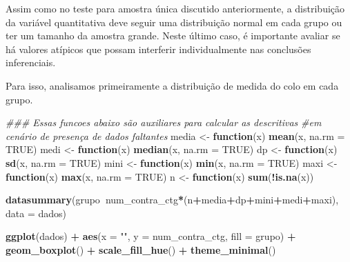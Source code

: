 \documentclass[
]{book}
\newenvironment{Shaded}{\begin{snugshade}}{\end{snugshade}}
\newcommand{\CommentTok}[1]{\textcolor[rgb]{0.56,0.35,0.01}{\textit{#1}}}
\newcommand{\ControlFlowTok}[1]{\textcolor[rgb]{0.13,0.29,0.53}{\textbf{#1}}}
\newcommand{\DataTypeTok}[1]{\textcolor[rgb]{0.13,0.29,0.53}{#1}}
\newcommand{\KeywordTok}[1]{\textcolor[rgb]{0.13,0.29,0.53}{\textbf{#1}}}
\newcommand{\NormalTok}[1]{#1}
\newcommand{\OperatorTok}[1]{\textcolor[rgb]{0.81,0.36,0.00}{\textbf{#1}}}
\newcommand{\OtherTok}[1]{\textcolor[rgb]{0.56,0.35,0.01}{#1}}
\newcommand{\StringTok}[1]{\textcolor[rgb]{0.31,0.60,0.02}{#1}}
\begin{document}
Assim como no teste para amostra única discutido anteriormente, a distribuição da variável quantitativa deve seguir uma distribuição normal em cada grupo ou ter um tamanho da amostra grande. Neste último caso, é importante avaliar se há valores atípicos que possam interferir individualmente nas conclusões inferenciais.

Para isso, analisamos primeiramente a distribuição de medida do colo em cada grupo.

\begin{Shaded}
\begin{Highlighting}[]
\CommentTok{### Essas funcoes abaixo são auxiliares para calcular as descritivas}
\CommentTok{#em cenário de presença de dados faltantes}
\NormalTok{media <-}\StringTok{ }\ControlFlowTok{function}\NormalTok{(x) }\KeywordTok{mean}\NormalTok{(x, }\DataTypeTok{na.rm =} \OtherTok{TRUE}\NormalTok{)}
\NormalTok{medi <-}\StringTok{ }\ControlFlowTok{function}\NormalTok{(x) }\KeywordTok{median}\NormalTok{(x, }\DataTypeTok{na.rm =} \OtherTok{TRUE}\NormalTok{)}
\NormalTok{dp <-}\StringTok{ }\ControlFlowTok{function}\NormalTok{(x) }\KeywordTok{sd}\NormalTok{(x, }\DataTypeTok{na.rm =} \OtherTok{TRUE}\NormalTok{)}
\NormalTok{mini <-}\StringTok{ }\ControlFlowTok{function}\NormalTok{(x) }\KeywordTok{min}\NormalTok{(x, }\DataTypeTok{na.rm =} \OtherTok{TRUE}\NormalTok{)}
\NormalTok{maxi <-}\StringTok{ }\ControlFlowTok{function}\NormalTok{(x) }\KeywordTok{max}\NormalTok{(x, }\DataTypeTok{na.rm =} \OtherTok{TRUE}\NormalTok{)}
\NormalTok{n <-}\StringTok{ }\ControlFlowTok{function}\NormalTok{(x) }\KeywordTok{sum}\NormalTok{(}\OperatorTok{!}\KeywordTok{is.na}\NormalTok{(x))}
\end{Highlighting}
\end{Shaded}

\begin{Shaded}
\begin{Highlighting}[]
\KeywordTok{datasummary}\NormalTok{(grupo}\OperatorTok{~}\NormalTok{num_contra_ctg}\OperatorTok{*}\NormalTok{(n}\OperatorTok{+}\NormalTok{media}\OperatorTok{+}\NormalTok{dp}\OperatorTok{+}\NormalTok{mini}\OperatorTok{+}\NormalTok{medi}\OperatorTok{+}\NormalTok{maxi), }\DataTypeTok{data =}\NormalTok{ dados)}
\end{Highlighting}
\end{Shaded}

\begin{Shaded}
\begin{Highlighting}[]
\KeywordTok{ggplot}\NormalTok{(dados) }\OperatorTok{+}
\StringTok{ }\KeywordTok{aes}\NormalTok{(}\DataTypeTok{x =} \StringTok{""}\NormalTok{, }\DataTypeTok{y =}\NormalTok{ num_contra_ctg, }\DataTypeTok{fill =}\NormalTok{ grupo) }\OperatorTok{+}
\StringTok{ }\KeywordTok{geom_boxplot}\NormalTok{() }\OperatorTok{+}
\StringTok{ }\KeywordTok{scale_fill_hue}\NormalTok{() }\OperatorTok{+}
\StringTok{ }\KeywordTok{theme_minimal}\NormalTok{()}
\end{Highlighting}
\end{Shaded}
\end{document}
